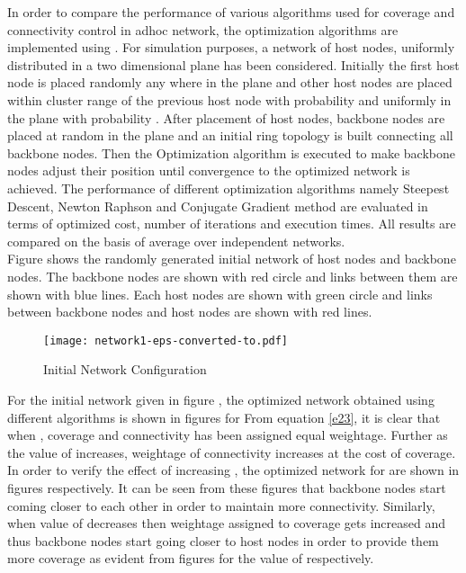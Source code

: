 \documentclass[11pt]{article}
\numberwithin{equation}{section}
\begin{document}
   In order to compare the performance of various algorithms used for coverage and connectivity control in adhoc network, the optimization algorithms are implemented using . For simulation purposes, a network of  host nodes, uniformly distributed in a  two dimensional plane has been considered. Initially the first host node is placed randomly any where in the plane and other host nodes are placed within cluster range of the previous host node with probability  and uniformly in the  plane with probability .  After placement of host nodes,  backbone nodes are placed at random in the plane and an initial ring topology is built connecting all backbone nodes. Then the Optimization algorithm is executed to make backbone nodes adjust their position until convergence to the optimized network is achieved. The performance of different optimization algorithms namely Steepest Descent, Newton Raphson and Conjugate Gradient method are evaluated in terms of optimized cost, number of iterations and execution times. All results are compared on the basis of average over  independent networks.\\

 Figure  shows the randomly generated initial network of  host nodes and  backbone nodes. The backbone nodes are shown with red circle and links between them are shown with blue lines. Each host nodes are shown with green circle and links between backbone nodes and host nodes are shown with red lines.\\
\begin{figure}[htb!]
\begin{center}
\texttt{[image: network1-eps-converted-to.pdf]}
\end{center}
\caption{Initial Network Configuration}\label{f1}
\end{figure}

For the initial network given in figure , the optimized network obtained using different algorithms is shown in figures  for  From equation \ref{e23}, it is clear that when , coverage and connectivity has been assigned equal weightage. Further as the value of  increases, weightage of connectivity increases at the cost of coverage. In order to verify the effect of increasing , the optimized network for  are shown in figures  respectively. It can be seen from these figures that backbone nodes start coming closer to each other in order to maintain more connectivity. Similarly, when value of  decreases then weightage assigned to coverage gets increased and thus backbone nodes start going closer to host nodes in order to provide them more coverage as evident from figures  for the value of  respectively.\\
\end{document}
